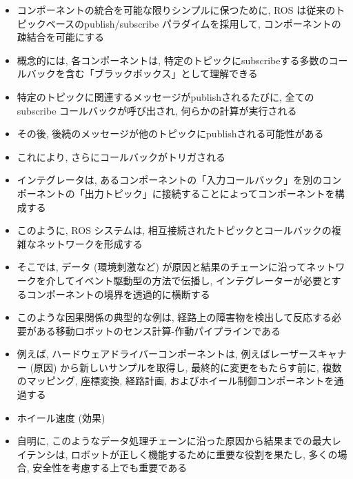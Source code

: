 \begin{frame}{}
    \begin{itemize}
        \item コンポーネントの統合を可能な限りシンプルに保つために, ROS は従来のトピックベースのpublish/subscribe パラダイムを採用して, コンポーネントの疎結合を可能にする
        \item 概念的には, 各コンポーネントは, 特定のトピックにsubscribeする多数のコールバックを含む「ブラックボックス」として理解できる
        \item 特定のトピックに関連するメッセージがpublishされるたびに, 全てのsubscribe コールバックが呼び出され, 何らかの計算が実行される
        \item その後, 後続のメッセージが他のトピックにpublishされる可能性がある
        \item これにより, さらにコールバックがトリガされる
        \item インテグレータは, あるコンポーネントの「入力コールバック」を別のコンポーネントの「出力トピック」に接続することによってコンポーネントを構成する
        \item このように, ROS システムは, 相互接続されたトピックとコールバックの複雑なネットワークを形成する
        \item そこでは, データ (環境刺激など) が原因と結果のチェーンに沿ってネットワークを介してイベント駆動型の方法で伝播し, インテグレーターが必要とするコンポーネントの境界を透過的に横断する
    \end{itemize}
\end{frame}

\begin{frame}{}
    \begin{itemize}
        \item このような因果関係の典型的な例は, 経路上の障害物を検出して反応する必要がある移動ロボットのセンス計算-作動パイプラインである
        \item 例えば, ハードウェアドライバーコンポーネントは, 例えばレーザースキャナー (原因) から新しいサンプルを取得し, 最終的に変更をもたらす前に, 複数のマッピング, 座標変換, 経路計画, およびホイール制御コンポーネントを通過する
        \item ホイール速度 (効果)
        \item 自明に, このようなデータ処理チェーンに沿った原因から結果までの最大レイテンシは, ロボットが正しく機能するために重要な役割を果たし, 多くの場合, 安全性を考慮する上でも重要である
    \end{itemize}
\end{frame}

